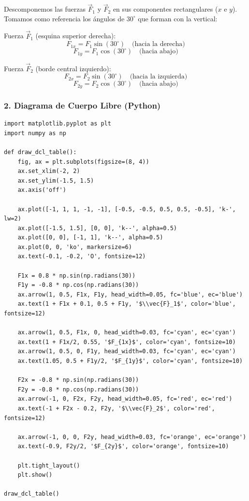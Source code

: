 \documentclass[12pt, a4paper]{article}
\begin{document}
Descomponemos las fuerzas $\vec{F}_1$ y $\vec{F}_2$ en sus componentes rectangulares ($x$ e $y$). Tomamos como referencia los ángulos de $30^\circ$ que forman con la vertical:

Fuerza $\vec{F}_1$ (esquina superior derecha):
$$F_{1x} = F_1 \sin(30^\circ) \quad \text{(hacia la derecha)}$$
$$F_{1y} = F_1 \cos(30^\circ) \quad \text{(hacia abajo)}$$

Fuerza $\vec{F}_2$ (borde central izquierdo):
$$F_{2x} = F_2 \sin(30^\circ) \quad \text{(hacia la izquierda)}$$
$$F_{2y} = F_2 \cos(30^\circ) \quad \text{(hacia abajo)}$$

\subsubsection*{2. Diagrama de Cuerpo Libre (Python)}

\begin{lstlisting}
import matplotlib.pyplot as plt
import numpy as np

def draw_dcl_table():
    fig, ax = plt.subplots(figsize=(8, 4))
    ax.set_xlim(-2, 2)
    ax.set_ylim(-1.5, 1.5)
    ax.axis('off')

    ax.plot([-1, 1, 1, -1, -1], [-0.5, -0.5, 0.5, 0.5, -0.5], 'k-', lw=2)
    ax.plot([-1.5, 1.5], [0, 0], 'k--', alpha=0.5)
    ax.plot([0, 0], [-1, 1], 'k--', alpha=0.5)
    ax.plot(0, 0, 'ko', markersize=6)
    ax.text(-0.1, -0.2, 'O', fontsize=12)

    F1x = 0.8 * np.sin(np.radians(30))
    F1y = -0.8 * np.cos(np.radians(30))
    ax.arrow(1, 0.5, F1x, F1y, head_width=0.05, fc='blue', ec='blue')
    ax.text(1 + F1x + 0.1, 0.5 + F1y, '$\\vec{F}_1$', color='blue', fontsize=12)

    ax.arrow(1, 0.5, F1x, 0, head_width=0.03, fc='cyan', ec='cyan')
    ax.text(1 + F1x/2, 0.55, '$F_{1x}$', color='cyan', fontsize=10)
    ax.arrow(1, 0.5, 0, F1y, head_width=0.03, fc='cyan', ec='cyan')
    ax.text(1.05, 0.5 + F1y/2, '$F_{1y}$', color='cyan', fontsize=10)

    F2x = -0.8 * np.sin(np.radians(30))
    F2y = -0.8 * np.cos(np.radians(30))
    ax.arrow(-1, 0, F2x, F2y, head_width=0.05, fc='red', ec='red')
    ax.text(-1 + F2x - 0.2, F2y, '$\\vec{F}_2$', color='red', fontsize=12)

    ax.arrow(-1, 0, 0, F2y, head_width=0.03, fc='orange', ec='orange')
    ax.text(-0.9, F2y/2, '$F_{2y}$', color='orange', fontsize=10)

    plt.tight_layout()
    plt.show()

draw_dcl_table()
\end{lstlisting}
\end{document}
